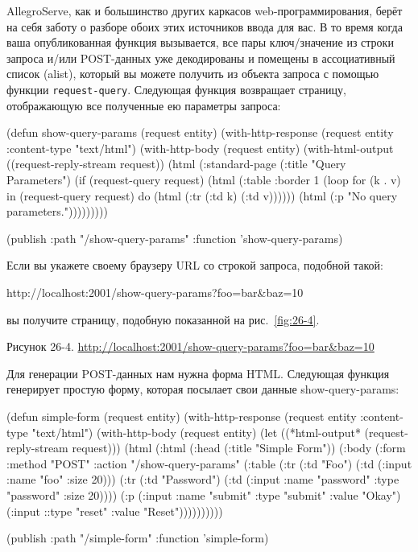 AllegroServe, как и большинство других каркасов web-программирования, берёт на себя заботу
о разборе обоих этих источников ввода для вас. В то время когда ваша опубликованная
функция вызывается, все пары ключ/значение из строки запроса и/или POST-данных уже
декодированы и помещены в ассоциативный список (alist), который вы можете получить из
объекта запроса с помощью функции \lstinline{request-query}. Следующая функция возвращает
страницу, отображающую все полученные ею параметры запроса:

\begin{myverb}
  (defun show-query-params (request entity)
    (with-http-response (request entity :content-type "text/html")
      (with-http-body (request entity)
        (with-html-output ((request-reply-stream request))
          (html
            (:standard-page
             (:title "Query Parameters")
             (if (request-query request)
               (html 
                 (:table :border 1
                         (loop for (k . v) in (request-query request)
                            do (html (:tr (:td k) (:td v))))))
               (html (:p "No query parameters.")))))))))

  (publish :path "/show-query-params" :function 'show-query-params)
\end{myverb}

Если вы укажете своему браузеру URL со строкой запроса, подобной такой:

\begin{myverb}
  http://localhost:2001/show-query-params?foo=bar&baz=10
\end{myverb}

\noindent{}вы получите страницу, подобную показанной на рис.~\ref{fig:26-4}.

Рисунок 26-4. \url{http://localhost:2001/show-query-params?foo=bar&baz=10}

Для генерации POST-данных нам нужна форма HTML. Следующая функция генерирует простую
форму, которая посылает свои данные show-query-params:

\begin{myverb}
  (defun simple-form (request entity)
    (with-http-response (request entity :content-type "text/html")
      (with-http-body (request entity)
        (let ((*html-output* (request-reply-stream request)))
          (html
            (:html
              (:head (:title "Simple Form"))
              (:body
               (:form :method "POST" :action "/show-query-params"
                 (:table
                  (:tr (:td "Foo")
                       (:td (:input :name "foo" :size 20)))
                  (:tr (:td "Password")
                       (:td (:input :name "password" :type "password" :size 20))))
                 (:p (:input :name "submit" :type "submit" :value "Okay")
                     (:input ::type "reset" :value "Reset"))))))))))

  (publish :path "/simple-form" :function 'simple-form)
\end{myverb}

